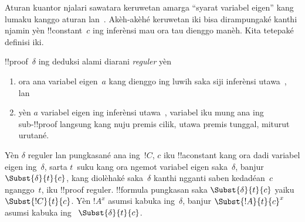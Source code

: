 \documentclass[../../../include/open-logic-section]{subfiles}
\begin{document}


Aturan kuantor njalari sawatara keruwetan amarga
``syarat variabel eigen'' kang lumaku kanggo aturan
\Elim{\lexists} lan~\Intro{\lforall}.
Akèh-akèhé keruwetan iki bisa dirampungaké kanthi njamin
yèn !!{constant}~$c$ ing inferènsi mau ora tau dienggo
manèh. Kita tetepaké definisi iki.

\begin{defn}
!!{proof}~$\delta$ ing deduksi alami diarani
\emph{reguler} yèn
\begin{enumerate}
  \item ora ana variabel eigen~$a$ kang dienggo ing
  luwih saka siji inferènsi \Elim{\lexists}
  utawa~\Intro{\lforall}, lan
  \item yèn $a$ variabel eigen ing inferènsi
  \Elim{\lexists} utawa~\Intro{\lforall},
  variabel iku mung ana ing sub-!!{proof} langsung
  kang nuju premis cilik, utawa premis tunggal,
  miturut urutané.
\end{enumerate}
\end{defn}

\begin{lem}
Yèn $\delta$ reguler lan pungkasané ana ing~$!C$,
$c$ iku !!a{constant} kang ora dadi variabel eigen
ing~$\delta$, sarta $t$~suku kang ora ngemot variabel
eigen saka~$\delta$, banjur
$\Subst{\delta}{t}{c}$, kang diolèhaké saka~$\delta$
kanthi ngganti saben kedadéan~$c$ nganggo~$t$,
iku !!{proof} reguler. !!{formula} pungkasan saka
$\Subst{\delta}{t}{c}$ yaiku $\Subst{!C}{t}{c}$.
Yèn $!A^x$ asumsi kabuka ing~$\delta$, banjur
$\Subst{!A}{t}{c}^x$ asumsi kabuka ing
~$\Subst{\delta}{t}{c}$.
\end{lem}
\end{document}

